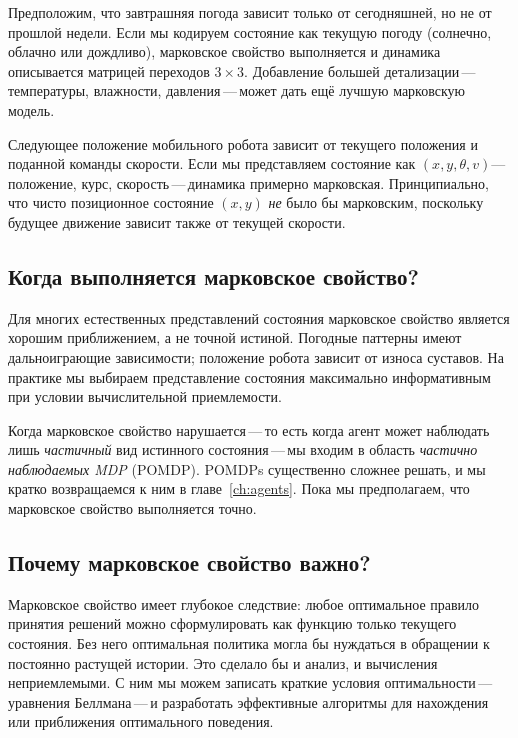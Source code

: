 \begin{example}
\label{ex:weather}
Предположим, что завтрашняя погода зависит только от сегодняшней, но не от прошлой недели. Если мы кодируем состояние как текущую погоду (солнечно, облачно или дождливо), марковское свойство выполняется и динамика описывается матрицей переходов $3 \times 3$. Добавление большей детализации\,---\,температуры, влажности, давления\,---\,может дать ещё лучшую марковскую модель.
\end{example}

\begin{example}
\label{ex:robot-nav}
Следующее положение мобильного робота зависит от текущего положения и поданной команды скорости. Если мы представляем состояние как $(x, y, \theta, v)$---положение, курс, скорость\,---\,динамика примерно марковская. Принципиально, что чисто позиционное состояние $(x, y)$ \emph{не} было бы марковским, поскольку будущее движение зависит также от текущей скорости.
\end{example}

\subsection*{Когда выполняется марковское свойство?}

Для многих естественных представлений состояния марковское свойство является хорошим приближением, а не точной истиной. Погодные паттерны имеют дальноиграющие зависимости; положение робота зависит от износа суставов. На практике мы выбираем представление состояния максимально информативным при условии вычислительной приемлемости.

Когда марковское свойство нарушается\,---\,то есть когда агент может наблюдать лишь \emph{частичный} вид истинного состояния\,---\,мы входим в область \emph{частично наблюдаемых MDP} (POMDP). POMDPs существенно сложнее решать, и мы кратко возвращаемся к ним в главе~\ref{ch:agents}. Пока мы предполагаем, что марковское свойство выполняется точно.

\subsection*{Почему марковское свойство важно?}

Марковское свойство имеет глубокое следствие: любое оптимальное правило принятия решений можно сформулировать как функцию только текущего состояния. Без него оптимальная политика могла бы нуждаться в обращении к постоянно растущей истории. Это сделало бы и анализ, и вычисления неприемлемыми. С ним мы можем записать краткие условия оптимальности\,---\,уравнения Беллмана\,---\,и разработать эффективные алгоритмы для нахождения или приближения оптимального поведения.


